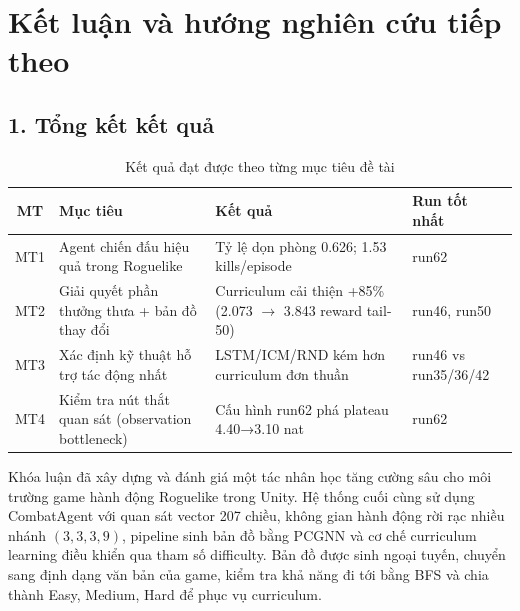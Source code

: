 \clearpage
{}


\chapter*{Kết luận và hướng nghiên cứu tiếp theo}

\section*{1. Tổng kết kết quả}

\begin{table}[H]
    \centering
    \small
    \caption{Kết quả đạt được theo từng mục tiêu đề tài}
    \label{tab:mt_results_summary}
    \begin{tabular}{|c|p{4.5cm}|p{4.5cm}|p{2.5cm}|}
        \hline
        \textbf{MT} & \textbf{Mục tiêu} & \textbf{Kết quả} & \textbf{Run tốt nhất} \\
        \hline
        MT1 & Agent chiến đấu hiệu quả trong Roguelike & Tỷ lệ dọn phòng 0.626; 1.53 kills/episode & run62 \\
        \hline
        MT2 & Giải quyết phần thưởng thưa + bản đồ thay đổi & Curriculum cải thiện +85\% (2.073 $\rightarrow$ 3.843 reward tail-50) & run46, run50 \\
        \hline
        MT3 & Xác định kỹ thuật hỗ trợ tác động nhất & LSTM/ICM/RND kém hơn curriculum đơn thuần & run46 vs run35/36/42 \\
        \hline
        MT4 & Kiểm tra nút thắt quan sát (observation bottleneck) & Cấu hình run62 phá plateau 4.40→3.10 nat & run62 \\
        \hline
    \end{tabular}
\end{table}

Khóa luận đã xây dựng và đánh giá một tác nhân học tăng cường sâu cho môi trường game hành động Roguelike trong Unity. Hệ thống cuối cùng sử dụng CombatAgent với quan sát vector 207 chiều, không gian hành động rời rạc nhiều nhánh $(3,3,3,9)$, pipeline sinh bản đồ bằng PCGNN và cơ chế curriculum learning điều khiển qua tham số difficulty. Bản đồ được sinh ngoại tuyến, chuyển sang định dạng văn bản của game, kiểm tra khả năng đi tới bằng BFS và chia thành Easy, Medium, Hard để phục vụ curriculum.

